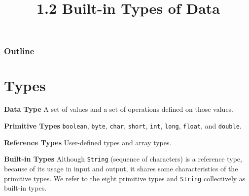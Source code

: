 \documentclass[8pt,a4paper,compress]{beamer}
\title{1.2 Built-in Types of Data}
\date{}
\begin{document}
\begin{frame}
\vfill
\titlepage
\end{frame}

\begin{frame}
\frametitle{Outline}
\tableofcontents
\end{frame}

\section{Types}
\begin{frame}[fragile]
\pause

\textbf{Data Type} A set of values and a set of operations defined on those values.

\pause
\smallskip

\textbf{Primitive Types} \lstinline$boolean$, \lstinline$byte$, \lstinline$char$, \lstinline$short$, \lstinline$int$, \lstinline$long$, \lstinline$float$, and \lstinline$double$.

\pause
\smallskip

\textbf{Reference Types} User-defined types and array types.

\pause
\smallskip
\textbf{Built-in Types} Although \lstinline$String$ (sequence of characters) is a reference type, because of its usage in input and output, it shares some characteristics of the primitive types. We refer to the eight primitive types and \lstinline$String$ collectively as built-in types.
\end{frame}
\end{document}
